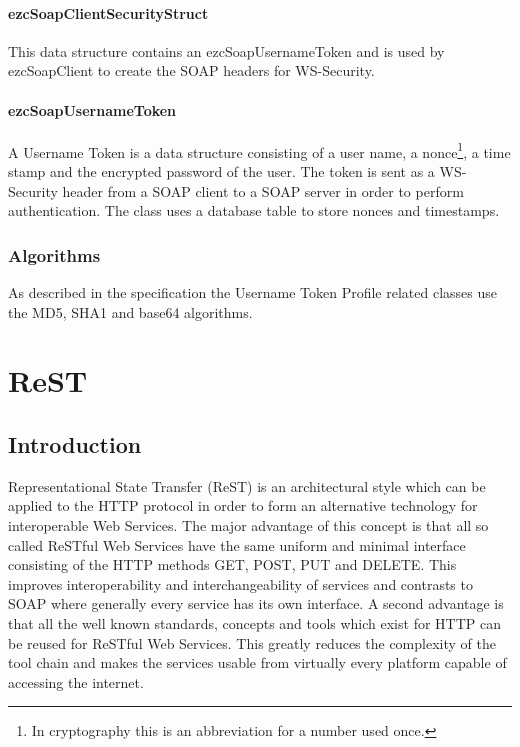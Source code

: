 \documentclass[10pt,final,a4paper,oneside]{article}
\begin{document}
\paragraph{ezcSoapClientSecurityStruct}
This data structure
contains an ezcSoapUsernameToken
and is used by ezcSoapClient
to create the SOAP headers for WS-Security.

\paragraph{ezcSoapUsernameToken}
A Username Token is a data structure
consisting of a user name,
a nonce\footnote{In cryptography this is an abbreviation for a number used once.},
a time stamp
and the encrypted password of the user.
The token is sent as a WS-Security header
from a SOAP client to a SOAP server
in order to perform authentication.
The class uses a database table to store
nonces and timestamps.


\subsubsection{Algorithms}
As described in the specification
the Username Token Profile related
classes use the MD5, SHA1 and base64 algorithms.






\section{ReST}\label{sec:ReST}
%
\subsection{Introduction}
Representational State Transfer (ReST) is an architectural style
which can be applied to the HTTP protocol \cite{HTTP}
in order to form an alternative technology
for interoperable Web Services.
The major advantage of this concept is
that all so called ReSTful Web Services have
the same uniform and minimal interface
consisting of the HTTP methods
GET, POST, PUT and DELETE.
This improves interoperability
and interchangeability of services and 
contrasts to SOAP where generally every service
has its own interface.
A second advantage is that all the well known standards, concepts and tools
which exist for HTTP can be reused for ReSTful Web Services.
This greatly reduces the complexity of the tool chain
and makes the services usable from virtually
every platform capable of accessing the internet.
\end{document}
